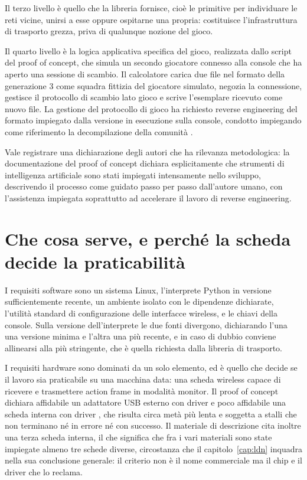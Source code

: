 Il terzo livello è quello che la libreria fornisce, cioè le primitive per individuare le reti vicine, unirsi a esse oppure ospitarne una propria: costituisce l'infrastruttura di trasporto grezza, priva di qualunque nozione del gioco.

Il quarto livello è la logica applicativa specifica del gioco, realizzata dallo script del proof of concept, che simula un secondo giocatore connesso alla console che ha aperto una sessione di scambio. Il calcolatore carica due file nel formato della generazione 3 come squadra fittizia del giocatore simulato, negozia la connessione, gestisce il protocollo di scambio lato gioco e scrive l'esemplare ricevuto come nuovo file. La gestione del protocollo di gioco ha richiesto reverse engineering del formato impiegato dalla versione in esecuzione sulla console, condotto impiegando come riferimento la decompilazione della comunità \cite{pokefirered}.

Vale registrare una dichiarazione degli autori che ha rilevanza metodologica: la documentazione del proof of concept dichiara esplicitamente che strumenti di intelligenza artificiale sono stati impiegati intensamente nello sviluppo, descrivendo il processo come guidato passo per passo dall'autore umano, con l'assistenza impiegata soprattutto ad accelerare il lavoro di reverse engineering.

\section{Che cosa serve, e perché la scheda decide la praticabilità}

I requisiti software sono un sistema Linux, l'interprete Python in versione sufficientemente recente, un ambiente isolato con le dipendenze dichiarate, l'utilità standard di configurazione delle interfacce wireless, e le chiavi della console. Sulla versione dell'interprete le due fonti divergono, dichiarando l'una una versione minima e l'altra una più recente, e in caso di dubbio conviene allinearsi alla più stringente, che è quella richiesta dalla libreria di trasporto.

I requisiti hardware sono dominati da un solo elemento, ed è quello che decide se il lavoro sia praticabile su una macchina data: una scheda wireless capace di ricevere e trasmettere action frame in modalità monitor. Il proof of concept dichiara affidabile un adattatore USB esterno con driver  e poco affidabile una scheda interna con driver , che risulta circa metà più lenta e soggetta a stalli che non terminano né in errore né con successo. Il materiale di descrizione cita inoltre una terza scheda interna, il che significa che fra i vari materiali sono state impiegate almeno tre schede diverse, circostanza che il capitolo~\ref{cap:ldn} inquadra nella sua conclusione generale: il criterio non è il nome commerciale ma il chip e il driver che lo reclama.

